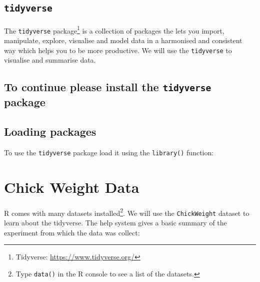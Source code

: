 \documentclass[a4paper,9pt,twocolumn,twoside,printwatermark=false]{pinp}
\begin{document}
\subsection{\texorpdfstring{\texttt{tidyverse}}{tidyverse}}\label{tidyverse}

The \texttt{tidyverse} package\footnote{Tidyverse:
  \url{https://www.tidyverse.org/}} is a collection of packages the lets
you import, manipulate, explore, visualise and model data in a
harmonised and consistent way which helps you to be more productive. We
will use the \texttt{tidyverse} to visualise and summarise data.

\subsection{\texorpdfstring{To continue please install the
\texttt{tidyverse}
package}{To continue please install the tidyverse package}}\label{to-continue-please-install-the-tidyverse-package}

\begin{Shaded}
\begin{Highlighting}[]
\NormalTok{(}\NormalTok{)}
\end{Highlighting}
\end{Shaded}

\subsection{Loading packages}\label{loading-packages}

To use the \texttt{tidyverse} package load it using the
\texttt{library()} function:

\begin{Shaded}
\begin{Highlighting}[]
\end{Highlighting}
\end{Shaded}

\section{Chick Weight Data}\label{chick-weight-data}

R comes with many datasets installed\footnote{Type \texttt{data()} in
  the R console to see a list of the datasets.}. We will use the
\texttt{ChickWeight} dataset to learn about the tidyverse. The help
system gives a basic summary of the experiment from which the data was
collect:
\end{document}
